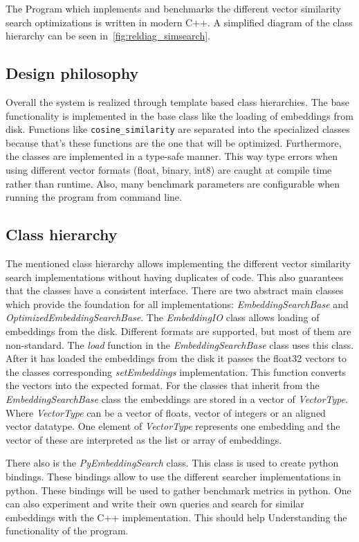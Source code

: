 \noindent The Program which implements and benchmarks the different vector similarity search optimizations is written in modern C++. A simplified diagram of the class hierarchy can be seen in~\autoref{fig:reldiag_simsearch}.
\subsection{Design philosophy}
Overall the system is realized through template based class hierarchies. The base functionality is implemented in the base class like the loading of embeddings from disk. Functions like \texttt{cosine\_similarity} are separated into the specialized classes because that's these functions are the one that will be optimized. Furthermore, the classes are implemented in a type-safe manner. This way type errors when using different vector formats (float, binary, int8) are caught at compile time rather than runtime. Also, many benchmark parameters are configurable when running the program from command line.

\subsection{Class hierarchy}
The mentioned class hierarchy allows implementing the different vector similarity search implementations without having duplicates of code. This also guarantees that the classes have a consistent interface. There are two abstract main classes which provide the foundation for all implementations: \textit{EmbeddingSearchBase} and \textit{OptimizedEmbeddingSearchBase}. The \textit{EmbeddingIO} class allows loading of embeddings from the disk. Different formats are supported, but most of them are non-standard. The \textit{load} function in the \textit{EmbeddingSearchBase} class uses this class. After it has loaded the embeddings from the disk it passes the float32 vectors to the classes corresponding \textit{setEmbeddings} implementation. This function converts the vectors into the expected format. For the classes that inherit from the \textit{EmbeddingSearchBase} class the embeddings are stored in a vector of \textit{VectorType}. Where \textit{VectorType} can be a vector of floats, vector of integers or an aligned vector datatype. One element of \textit{VectorType} represents one embedding and the vector of these are interpreted as the list or array of embeddings.

There also is the \textit{PyEmbeddingSearch} class. This class is used to create python bindings. These bindings allow to use the different searcher implementations in python. These bindings will be used to gather benchmark metrics in python. One can also experiment and write their own queries and search for similar embeddings with the C++ implementation. This should help Understanding the functionality of the program.

